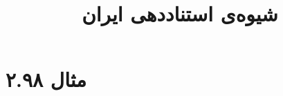 \documentclass[a4paper,10pt]{article}
\begin{document}
\title{شیوه‌ی استناددهی ایران}
\author{}
\date{}
\maketitle



\section*{مثال ۲.۹۸}

\cite{ماهبان1354}\\
\cite{سینایی1382}\\
\\
\\






\end{document}

